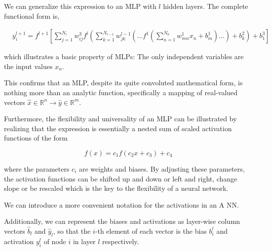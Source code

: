 We can generalize this expression to an MLP with $l$ hidden
layers. The complete functional form is,

\begin{align}
&y^{l+1}_i = f^{l+1}\left[\!\sum_{j=1}^{N_l} w_{ij}^3 f^l\left(\sum_{k=1}^{N_{l-1}}w_{jk}^{l-1}\left(\dots f^1\left(\sum_{n=1}^{N_0} w_{mn}^1 x_n+ b_m^1\right)\dots\right)+b_k^2\right)+b_1^3\right] &&
 \label{completeNN}
\end{align}

which illustrates a basic property of MLPs: The only independent
variables are the input values $x_n$.

This confirms that an MLP, despite its quite convoluted mathematical
form, is nothing more than an analytic function, specifically a
mapping of real-valued vectors $\hat{x} \in \mathbb{R}^n \rightarrow
\hat{y} \in \mathbb{R}^m$.

Furthermore, the flexibility and universality of an MLP can be
illustrated by realizing that the expression is essentially a nested
sum of scaled activation functions of the form

\begin{equation}
 f(x) = c_1 f(c_2 x + c_3) + c_4
\end{equation}

where the parameters $c_i$ are weights and biases. By adjusting these
parameters, the activation functions can be shifted up and down or
left and right, change slope or be rescaled which is the key to the
flexibility of a neural network.

We can introduce a more convenient notation for the activations in an A NN. 

Additionally, we can represent the biases and activations
as layer-wise column vectors $\hat{b}_l$ and $\hat{y}_l$, so that the $i$-th element of each vector 
is the bias $b_i^l$ and activation $y_i^l$ of node $i$ in layer $l$ respectively. 

